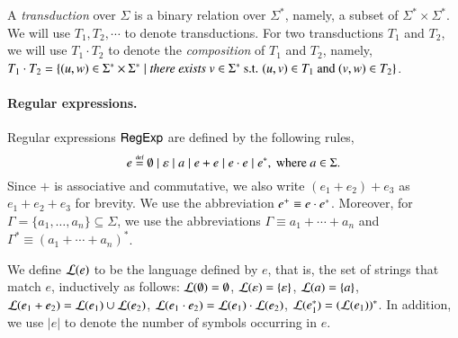 A \emph{transduction} over $\Sigma$ is a binary relation over $\Sigma^*$, namely, a subset of $\Sigma^* \times \Sigma^*$. We will use $T_1, T_2,\cdots$ to denote transductions. For two transductions $T_1$ and $T_2$, we will use $T_1 \cdot T_2$ to denote the \emph{composition} of $T_1$ and $T_2$, namely, $T_1 \cdot T_2 = \{(u, w) \in \Sigma^* \times \Sigma^* \mid \emph{there exists } v \in \Sigma^* \mbox{ s.t. } (u,v) \in T_1 \mbox{ and } (v,w) \in T_2\}$.


\paragraph*{Regular expressions.}
Regular expressions ${\sf RegExp}$ are defined by the following rules,
%
	\[e \eqdef \emptyset \mid \varepsilon \mid a \mid e + e \mid e \concat e \mid e^*, \mbox{ where } a \in \Sigma. \]
%
Since $+$ is associative and commutative, we also write $(e_1 + e_2) + e_3$ as $e_1 + e_2 + e_3$ for brevity. We use the abbreviation $e^+ \equiv e \cdot e^*$. Moreover, for $\Gamma = \{a_1, \ldots, a_n\}\subseteq \Sigma$, we use the abbreviations $\Gamma \equiv a_1 + \cdots + a_n$ and $\Gamma^\ast \equiv (a_1 + \cdots + a_n)^\ast$. 

We define $\mathcal{L}(e)$ to be the language defined by $e$, that is, the set of strings that match $e$, inductively as follows: $\mathcal{L}(\emptyset) =\emptyset$,
$\mathcal{L}(\varepsilon) =\{\varepsilon\}$,
%
$\mathcal{L}(a)= \{a\}$,
%
$\mathcal{L}(e_1 + e_2) = \mathcal{L}(e_1) \cup \mathcal{L}(e_2)$,
%
$\mathcal{L}(e_1 \cdot e_2) = \mathcal{L}(e_1) \cdot \mathcal{L}(e_2)$,
%
$\mathcal{L}(e_1^*)=(\mathcal{L}(e_1))^*$.
In addition, we use $|e|$ to denote the number of symbols occurring in $e$.


